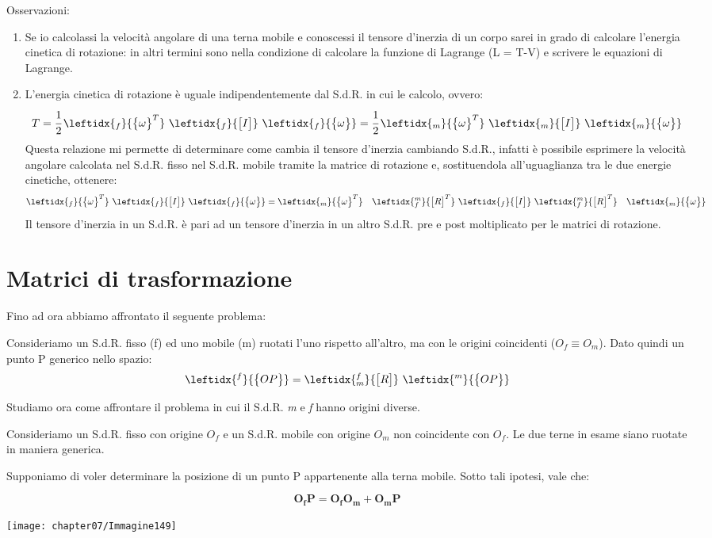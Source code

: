  Osservazioni:\begin{enumerate}
 \item Se io calcolassi la velocità angolare di una terna mobile e conoscessi il tensore d'inerzia di un corpo sarei in grado di calcolare l'energia cinetica di rotazione: in altri termini sono nella condizione di calcolare la funzione di Lagrange (L = T-V) e scrivere le equazioni di Lagrange.
 \item L'energia cinetica di rotazione è uguale indipendentemente dal S.d.R. in cui le calcolo, ovvero:
 \[T = \cfrac{1}{2}\,\leftidx{_f}{\B{\omega}^T}\,\,\leftidx{_f}{\M{I}}\,\,\leftidx{_f}{\B{\omega}} = \cfrac{1}{2}\,\leftidx{_m}{\B{\omega}^T}\,\,\leftidx{_m}{\M{I}}\,\,\leftidx{_m}{\B{\omega}}\]
 Questa relazione mi permette di determinare come cambia il tensore d'inerzia cambiando S.d.R., infatti è possibile esprimere la velocità angolare calcolata nel S.d.R. fisso nel S.d.R. mobile tramite la matrice di rotazione e, sostituendola all'uguaglianza tra le due energie cinetiche, ottenere:
 \[
 \leftidx{_f}{\B{\omega}^T}\,\,\leftidx{_f}{\M{I}}\,\,\leftidx{_f}{\B{\omega}} = \leftidx{_m}{\B{\omega}^T}\quad\leftidx{_f^m}{\M{R}^T}\,\,\leftidx{_f}{\M{I}}\,\,\leftidx{_f^m}{\M{R}^T}\quad\leftidx{_m}{\B{\omega}}
 \]
 Il tensore d'inerzia in un S.d.R. è pari ad un tensore d'inerzia in un altro S.d.R. pre e post moltiplicato per le matrici di rotazione.
 \end{enumerate}
 
 \section{Matrici di trasformazione}
 
 Fino ad ora abbiamo affrontato il seguente problema:
 
 Consideriamo un S.d.R. fisso (f) ed uno mobile (m) ruotati l'uno rispetto all'altro, ma con le origini coincidenti ($O_f \equiv O_m$).
 Dato quindi un punto P generico nello spazio:
 \[\leftidx{^f}{\B{OP}} = \leftidx{_m^f}{\M{R}}\,\,\leftidx{^m}{\B{OP}}\] 
 
 Studiamo ora come affrontare il problema in cui il S.d.R. \emph{m} e \emph{f} hanno origini diverse. 
 \vspace{2mm}
 
 \begin{minipage}{.5\textwidth}
 Consideriamo un S.d.R. fisso con origine $O_f$ e un S.d.R. mobile con origine $O_m$ non coincidente con $O_f$. Le due terne in esame siano ruotate in maniera generica.
 
 Supponiamo di voler determinare la posizione di un punto P appartenente alla terna mobile. Sotto tali ipotesi, vale che:
 
 \[\mathbf{O_fP} = \mathbf{O_fO_m} + \mathbf{O_mP}\] 
 \end{minipage}
\hfill
\begin{minipage}{.5\textwidth}
\centering
\texttt{[image: chapter07/Immagine149]}
\end{minipage}
\vspace{1mm}

